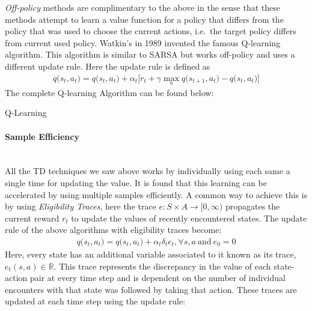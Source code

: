 \documentclass[12pt]{extarticle}
\newcommand{\myparagraph}[1]{\paragraph{#1}\mbox{}\\ \linebreak}
\numberwithin{equation}{section}
\begin{document}
	\textit{Off-policy} methods are complimentary to the above in the sense that these methods attempt to learn a value function for a policy that differs from the policy that was used to choose the current actions, i.e.\ the target policy differs from current used policy. Watkin's in 1989 invented the famous Q-learning algorithm\cite{watkins1989Qlearning}. This algorithm is similar to SARSA but works off-policy and uses a different update rule. Here the update rule is defined as 
	\begin{align}\label{eq:q-update}
	q\big(s_t,a_t\big) = q\big(s_t,a_t\big) + \alpha_t\big[r_t + \gamma \max_{a}q\big(s_{t+1},a_t\big) - q\big(s_t,a_t\big)\big]
	\end{align}
	The complete Q-learning Algorithm can be found below:
	\begin{algorithm}[h]
		\DontPrintSemicolon
		\SetAlgoLined
		
		\caption{Q-Learning}\label{alg:q-learning}
	\end{algorithm}
	\myparagraph{Sample Efficiency}
	All the TD techniques we saw above works by individually using each same a single time for updating the value. It is found that this learning can be accelerated by using multiple samples efficiently. A common way to achieve this is by using \textit{Eligibility Traces}, here the trace $e \colon S \times A \rightarrow [0,\infty)$ propagates the current reward $r_t$ to update the values of recently encountered states. The update rule of the above algorithms with eligibility traces become:
	\begin{align}
	q\big(s_t,a_t\big) = q\big(s_t,a_t\big) + \alpha_t\delta_{t}e_t, \forall s,a \ \text{and} \ e_0 = 0
	\end{align}
	Here, every state has an additional variable associated to it known as its trace, $e_t(s,a) \in \mathbb{R}$. This trace represents the discrepancy in the value of each state-action pair at every time step and is dependent on the number of individual encounters with that state was followed by taking that action. These traces are updated at each time step using the update rule:
\end{document}
